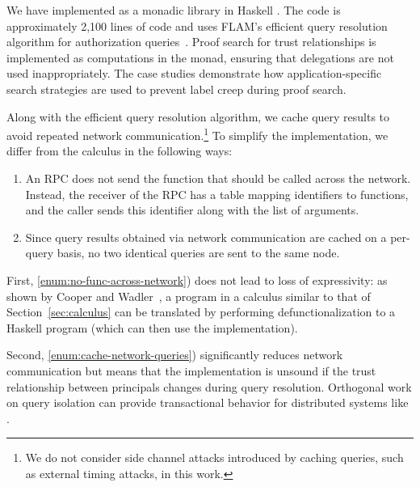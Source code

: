 We have implemented \lang{} as a monadic library in Haskell \cite{flamiolib}. The code is approximately 2,100 lines of code and uses FLAM's efficient query resolution algorithm for authorization queries~\cite{Arden:2015:FA:2859845.2859998}. Proof search for trust relationships is implemented as computations in the \lang{} monad, ensuring that delegations are not used inappropriately. The case studies demonstrate how application-specific search strategies are used to prevent label creep during proof search.

Along with the efficient query resolution algorithm, we cache query results to avoid repeated network communication.\footnote{We do not consider side channel attacks introduced by caching queries, such as external timing attacks, in this work.}
To simplify the implementation, we differ from the calculus in the following ways:
\begin{enumerate}
    \item \label{enum:no-func-across-network} An RPC does not send the function that should be called across the network. Instead, the receiver of the RPC has a table mapping identifiers to functions, and the caller sends this identifier along with the list of arguments.
    \item \label{enum:cache-network-queries} Since query results obtained via network communication are cached on a per-query basis, no two identical queries are sent to the same node.
\end{enumerate}

First, \ref{enum:no-func-across-network}) does not lead to loss of expressivity: as shown by Cooper and Wadler~\cite{Cooper:2009:RC:1599410.1599439},  a program in a calculus similar to that of Section~\ref{sec:calculus} can be translated by performing defunctionalization to a Haskell program (which can then use the \lang{} implementation). 

Second, \ref{enum:cache-network-queries}) significantly reduces network communication but means that the implementation is unsound if the trust relationship between principals changes during query resolution. Orthogonal work on query isolation \cite{Liu:2009:FPS:1629575.1629606} can provide transactional behavior for distributed systems like \lang.

